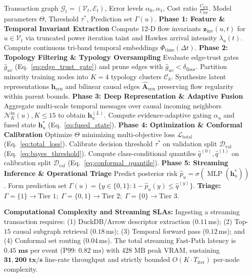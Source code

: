 \begin{algorithm}[t]
\caption{C-STGB Unified Multi-Stage Pipeline}
\label{alg:cstgb_pipeline}
\footnotesize\linespread{0.90}\selectfont
\begin{algorithmic}[1]
\Require Transaction graph $\mathcal{G}_t=(\mathcal{V}_t, \mathcal{E}_t)$, Error levels $\alpha_0, \alpha_1$, Cost ratio $\frac{C_{\text{FN}}}{C_{\text{FP}}}$.
\Ensure Model parameters $\Theta$, Threshold $\tau^*$, Prediction set $\Gamma(u)$.
\State \textbf{Phase 1: Feature \& Temporal Invariant Extraction}
\State Compute 12-D flow invariants $\mathbf{z}_{\text{inv}}(u, t)$ for $u \in \mathcal{V}_t$ via truncated power iteration taint and Hawkes arrival intensity $\lambda_u(t)$.
\State Compute continuous tri-band temporal embeddings $\Phi_{\text{time}}(\Delta t)$.
\State \textbf{Phase 2: Topology Filtering \& Typology Oversampling}
\State Evaluate edge-trust gates $\hat{g}_{uv}$ (Eq.~\ref{eq:edge_trust_gate}) and prune edges with $\hat{g}_{uv} < \delta_{\text{floor}}$.
\State Partition minority training nodes into $K=4$ typology clusters $\mathcal{C}_k$.
\State Synthesize latent representations $\mathbf{h}_{\text{syn}}$ and bilinear causal edges $\hat{\mathbf{A}}_{\text{syn}}$ preserving flow regularity within parent bounds.
\State \textbf{Phase 3: Deep Representation \& Adaptive Fusion}
\State Aggregate multi-scale temporal messages over causal incoming neighbors $\mathcal{N}_K^{\text{in}}(u), K \le 15$ to obtain $\mathbf{h}_u^{(L)}$.
\State Compute evidence-adaptive gating $\alpha_u$ and fused state $\mathbf{h}_u^*$ (Eq.~\ref{eq:fused_state}).
\State \textbf{Phase 4: Optimization \& Conformal Calibration}
\State Optimize $\Theta$ minimizing multi-objective loss $\mathcal{L}_{\text{total}}$ (Eq.~\ref{eq:total_loss}).
\State Calibrate decision threshold $\tau^*$ on validation split $\mathcal{D}_{\text{val}}$ (Eq.~\ref{eq:bayes_threshold}).
\State Compute class-conditional quantiles $\hat{q}^{(0)}, \hat{q}^{(1)}$ on calibration split $\mathcal{D}_{\text{cal}}$ (Eq.~\ref{eq:conformal_quantile}).
\State \textbf{Phase 5: Streaming Inference \& Operational Triage}
\State Predict posterior risk $\hat{p}_u = \sigma(\operatorname{MLP}(\mathbf{h}_u^*))$.
\State Form prediction set $\Gamma(u) = \{y \in \{0, 1\} : 1 - \hat{p}_u(y) \le \hat{q}^{(y)}\}$.
\State \textbf{Triage:} $\Gamma=\{1\} \to \text{Tier 1}; \; \Gamma=\{0,1\} \to \text{Tier 2}; \; \Gamma=\{0\} \to \text{Tier 3}$.
\end{algorithmic}
\end{algorithm}

\textbf{Computational Complexity and Streaming SLAs:} Ingesting a streaming transaction requires: (1) DuckDB/Arrow descriptor extraction ($0.11$\,ms); (2) Top-$15$ causal subgraph retrieval ($0.18$\,ms); (3) Temporal forward pass ($0.12$\,ms); and (4) Conformal set routing ($0.04$\,ms). The total streaming Fast-Path latency is $\mathbf{0.45\text{ ms}}$ per event (P99: $0.82\text{ ms}$) with $428\text{ MB}$ peak VRAM, sustaining $\mathbf{31{,}200\text{ tx/s}}$ line-rate throughput and strictly bounded $O(K \cdot T_{\text{iter}})$ per-node complexity.
